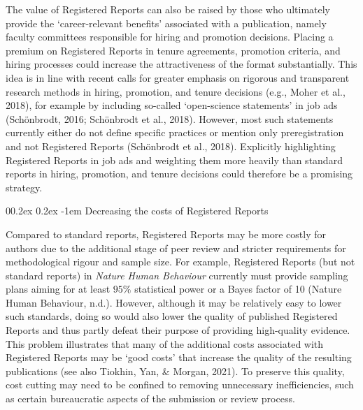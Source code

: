 \documentclass[
  ,man,mask,floatsintext]{apa6}
\makeatletter
\let\oldparagraph\paragraph
\renewcommand{\paragraph}[1]{\oldparagraph{#1}\mbox{}}
\renewcommand{\paragraph}{\@startsection{paragraph}{4}{\parindent}%
  {0\baselineskip \@plus 0.2ex \@minus 0.2ex}%
  {-1em}%
  {\normalfont\normalsize\bfseries\itshape\typesectitle}}
\makeatother
\begin{document}
The value of Registered Reports can also be raised by those who ultimately provide the `career-relevant benefits' associated with a publication, namely faculty committees responsible for hiring and promotion decisions.
Placing a premium on Registered Reports in tenure agreements, promotion criteria, and hiring processes could increase the attractiveness of the format substantially.
This idea is in line with recent calls for greater emphasis on rigorous and transparent research methods in hiring, promotion, and tenure decisions (e.g., Moher et al., 2018), for example by including so-called `open-science statements' in job ads (Schönbrodt, 2016; Schönbrodt et al., 2018).
However, most such statements currently either do not define specific practices or mention only preregistration and not Registered Reports (Schönbrodt et al., 2018).
Explicitly highlighting Registered Reports in job ads and weighting them more heavily than standard reports in hiring, promotion, and tenure decisions could therefore be a promising strategy.

\par\vspace{0.4\baselineskip}

\hypertarget{decreasing-the-costs-of-registered-reports}{%
\paragraph{Decreasing the costs of Registered Reports}\label{decreasing-the-costs-of-registered-reports}}

Compared to standard reports, Registered Reports may be more costly for authors due to the additional stage of peer review
and stricter requirements for methodological rigour and sample size.
For example, Registered Reports (but not standard reports) in \emph{Nature Human Behaviour} currently must provide sampling plans aiming for at least \(95\%\) statistical power or a Bayes factor of 10 (Nature Human Behaviour, n.d.).
However, although it may be relatively easy to lower such standards,
doing so would also lower the quality of published Registered Reports and thus partly defeat their purpose of providing high-quality evidence.
This problem illustrates that many of the additional costs associated with Registered Reports may be `good costs' that increase the quality of the resulting publications (see also Tiokhin, Yan, \& Morgan, 2021).
To preserve this quality, cost cutting may need to be confined to removing unnecessary inefficiencies, such as certain bureaucratic aspects of the submission or review process.
\end{document}
